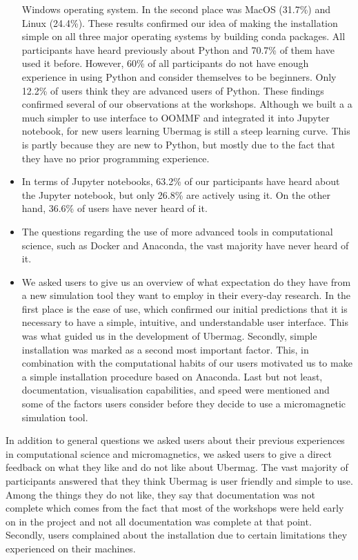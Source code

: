 \documentclass{deliverablereport}
\begin{document}
\begin{itemize}
Windows operating system. In the second place was MacOS (31.7\%) and
Linux (24.4\%). These results confirmed our idea of making the
installation simple on all three major operating systems by building
conda packages. All participants have heard previously about Python
and 70.7\% of them have used it before. However, 60\% of all
participants do not have enough experience in using Python and
consider themselves to be beginners. Only 12.2\% of users think they are
advanced users of Python. These findings confirmed several of our
observations at the workshops. Although we built a a much simpler to
use interface to OOMMF and integrated it into Jupyter notebook, for
new users learning Ubermag is still a steep learning curve. This is
partly because they are new to Python, but mostly due to the fact that
they have no prior programming experience.
\item In terms of Jupyter notebooks, 63.2\% of our participants have
heard about the Jupyter notebook, but only 26.8\% are actively using
it. On the other hand, 36.6\% of users have never heard of it.
\item The questions regarding the use of more advanced tools in
computational science, such as Docker and Anaconda, the vast majority
have never heard of it.
  \item We asked users to give us an overview of what expectation do
they have from a new simulation tool they want to employ in their
every-day research. In the first place is the ease of use, which
confirmed our initial predictions that it is necessary to have a
simple, intuitive, and understandable user interface. This was what
guided us in the development of Ubermag. Secondly, simple installation
was marked as a second most important factor. This, in combination
with the computational habits of our users motivated us to make a
simple installation procedure based on Anaconda. Last but not least,
documentation, visualisation capabilities, and speed were mentioned
and some of the factors users consider before they decide to use a
micromagnetic simulation tool.
\end{itemize}

In addition to general questions we asked users about their previous
experiences in computational science and micromagnetics, we asked
users to give a direct feedback on what they like and do not like
about Ubermag. The vast majority of participants answered that they
think Ubermag is user friendly and simple to use. Among the things
they do not like, they say that documentation was not complete which
comes from the fact that most of the workshops were held early on in
the project and not all documentation was complete at that
point. Secondly, users complained about the installation due to
certain limitations they experienced on their machines.
\end{document}
